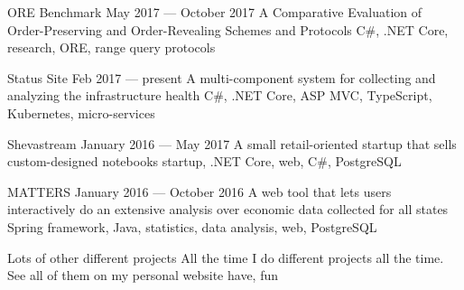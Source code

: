 
\begin{projects}
	\project%
		{ORE Benchmark}
		{May 2017 --- October 2017}
		{ }
		{A Comparative Evaluation of Order-Preserving and Order-Revealing Schemes and Protocols}
		{{C\#}, {.NET Core}, research, ORE, range query protocols}

	\project%
		{Status Site}
		{Feb 2017 --- present}
		{ }
		{A multi-component system for collecting and analyzing the infrastructure health}
		{{C\#}, {.NET Core}, ASP MVC, TypeScript, Kubernetes, micro-services}

	\project%
		{Shevastream}
		{January 2016 --- May 2017}
		{ }
		{A small retail-oriented startup that sells custom-designed notebooks}
		{startup, {.NET Core}, web, {C\#}, PostgreSQL}

	\project%
		{MATTERS}
		{January 2016 --- October 2016}
		{ }
		{A web tool that lets users interactively do an extensive analysis over economic data collected for all states}
		{Spring framework, Java, statistics, data analysis, web, PostgreSQL}


	\project%
		{Lots of other different projects}
		{All the time}
		{ }
		{
			I do different projects all the time.
			See all of them on my personal website 
		}
		{have, fun}

\end{projects}
